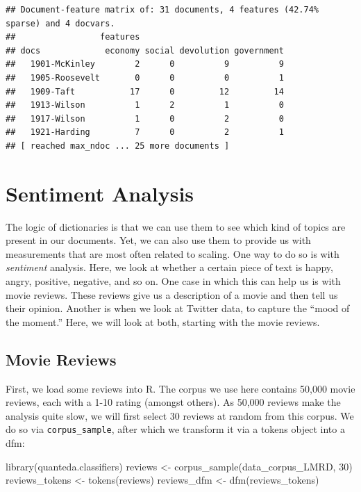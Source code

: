 \documentclass[
]{book}
\newenvironment{Shaded}{\begin{snugshade}}{\end{snugshade}}
\newcommand{\DecValTok}[1]{\textcolor[rgb]{0.00,0.00,0.81}{#1}}
\newcommand{\FunctionTok}[1]{\textcolor[rgb]{0.00,0.00,0.00}{#1}}
\newcommand{\NormalTok}[1]{#1}
\newcommand{\OtherTok}[1]{\textcolor[rgb]{0.56,0.35,0.01}{#1}}
\begin{document}
\begin{verbatim}
## Document-feature matrix of: 31 documents, 4 features (42.74% sparse) and 4 docvars.
##                 features
## docs             economy social devolution government
##   1901-McKinley        2      0          9          9
##   1905-Roosevelt       0      0          0          1
##   1909-Taft           17      0         12         14
##   1913-Wilson          1      2          1          0
##   1917-Wilson          1      0          2          0
##   1921-Harding         7      0          2          1
## [ reached max_ndoc ... 25 more documents ]
\end{verbatim}

\hypertarget{sentiment-analysis}{%
\section{Sentiment Analysis}\label{sentiment-analysis}}

The logic of dictionaries is that we can use them to see which kind of topics are present in our documents. Yet, we can also use them to provide us with measurements that are most often related to scaling. One way to do so is with \emph{sentiment} analysis. Here, we look at whether a certain piece of text is happy, angry, positive, negative, and so on. One case in which this can help us is with movie reviews. These reviews give us a description of a movie and then tell us their opinion. Another is when we look at Twitter data, to capture the ``mood of the moment.'' Here, we will look at both, starting with the movie reviews.

\hypertarget{movie-reviews}{%
\subsection{Movie Reviews}\label{movie-reviews}}

First, we load some reviews into R. The corpus we use here contains 50,000 movie reviews, each with a 1-10 rating (amongst others). As 50,000 reviews make the analysis quite slow, we will first select 30 reviews at random from this corpus. We do so via \texttt{corpus\_sample}, after which we transform it via a tokens object into a dfm:

\begin{Shaded}
\begin{Highlighting}[]
\FunctionTok{library}\NormalTok{(quanteda.classifiers)}
\NormalTok{reviews }\OtherTok{\textless{}{-}} \FunctionTok{corpus\_sample}\NormalTok{(data\_corpus\_LMRD, }\DecValTok{30}\NormalTok{)}
\NormalTok{reviews\_tokens }\OtherTok{\textless{}{-}} \FunctionTok{tokens}\NormalTok{(reviews)}
\NormalTok{reviews\_dfm }\OtherTok{\textless{}{-}} \FunctionTok{dfm}\NormalTok{(reviews\_tokens)}
\end{Highlighting}
\end{Shaded}
\end{document}
